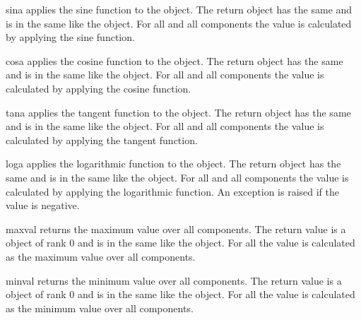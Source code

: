 \begin{funcdesc}{sin}{a}
applies the sine function to the object. The
return \Data object has the same \Shape and is in the same
\FunctionSpace like the object. For all \DataSamplePoints and all
components the value is calculated by applying the sine function. 
\end{funcdesc}

\begin{funcdesc}{cos}{a}
applies the cosine function to the object. The
return \Data object has the same \Shape and is in the same
\FunctionSpace like the object. For all \DataSamplePoints and all
components the value is calculated by applying the cosine function. 
\end{funcdesc}

\begin{funcdesc}{tan}{a}
applies the tangent function to the object. The
return \Data object has the same \Shape and is in the same
\FunctionSpace like the object. For all \DataSamplePoints and all
components the value is calculated by applying the tangent function. 
\end{funcdesc}

\begin{funcdesc}{log}{a}
applies the logarithmic function to the object. The
return \Data object has the same \Shape and is in the same
\FunctionSpace like the object. For all \DataSamplePoints and all
components the value is calculated by applying the logarithmic function. An exception is
raised if the value is negative.
\end{funcdesc}

\begin{funcdesc}{maxval}{}
returns the maximum value over all components. The
return value is a \Data object of rank 0 
and is in the same
\FunctionSpace like the object. For all \DataSamplePoints
the value is calculated as the maximum value over all components. 
\end{funcdesc}

\begin{funcdesc}{minval}{}
returns the minimum value over all components. The
return value is a \Data object of rank 0 
and is in the same
\FunctionSpace like the object. For all \DataSamplePoints
the value is calculated as the minimum value over all components. 
\end{funcdesc}

